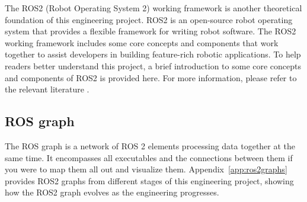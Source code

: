 
The ROS2 (Robot Operating System 2) working framework is another theoretical foundation of this engineering project. ROS2 is an open-source robot operating system that provides a flexible framework for writing robot software. The ROS2 working framework includes some core concepts and components that work together to assist developers in building feature-rich robotic applications. To help readers better understand this project, a brief introduction to some core concepts and components of ROS2 is provided here. For more information, please refer to the relevant literature \citep{ros2humble}.

\subsection{ROS graph}
\label{sec:ros2_graph}
The ROS graph is a network of ROS 2 elements processing data together at the same time. It encompasses all executables and the connections between them if you were to map them all out and visualize them. Appendix~\ref{app:ros2graphs} provides ROS2 graphs from different stages of this engineering project, showing how the ROS2 graph evolves as the engineering progresses.

